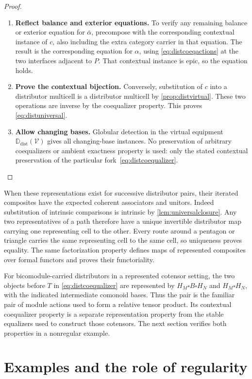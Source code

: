 \documentclass[11pt,reqno]{amsart}
\theoremstyle{plain}
\theoremstyle{definition}
\theoremstyle{remark}
\numberwithin{equation}{section}
\newcommand{\V}{\mathcal V}
\newcommand{\Ddist}{\mathbb D_{\mathrm{dist}}}
\begin{document}
\begin{proof}
\begin{enumerate}
\item \textbf{Reflect balance and exterior equations.} To verify
any remaining balance or exterior equation for $\bar\alpha$,
precompose with the corresponding contextual instance of $c$, also
including the extra category carrier in that equation. The result is
the corresponding equation for $\alpha$, using
\cref{eq:distcoeqactions} at the two interfaces adjacent to $P$.
That contextual instance is epic, so the equation holds.

\item \textbf{Prove the contextual bijection.} Conversely,
substitution of $c$ into a distributor multicell is a distributor
multicell by \cref{prop:distvirtual}. These two operations are inverse
by the coequalizer property. This proves \cref{eq:distuniversal}.

\item \textbf{Allow changing bases.} Globular detection in the virtual equipment $\Ddist(\V)$ gives all
changing-base instances. No preservation of arbitrary coequalizers or
ambient exactness property is used: only the stated contextual preservation
of the particular fork~\eqref{eq:distcoequalizer}.\qedhere
\end{enumerate}
\end{proof}

When these representations exist for successive distributor pairs, their
iterated composites have the expected coherent associators and unitors.
Indeed substitution of intrinsic comparisons is intrinsic by
\cref{lem:universalclosure}. Any two representatives of a path therefore
have a unique invertible distributor map carrying one representing cell
to the other. Every route around a pentagon or triangle carries the same
representing cell to the same cell, so uniqueness proves equality. The
same factorization property defines maps of represented composites over
formal functors and proves their functoriality.

For bicomodule-carried distributors in a represented cotensor setting,
the two objects before $T$ in \cref{eq:distcoequalizer} are represented
by $H_M\square B\square H_N$ and $H_M\square H_N$, with the
indicated intermediate comonoid bases. Thus the pair is the familiar
pair of module actions used to form a relative tensor product. Its
contextual coequalizer property is a separate representation property
from the stable equalizers used to construct those cotensors. The next
section verifies both properties in a nonregular example.

\section{Examples and the role of regularity}\label{sec:examples}
\end{document}
